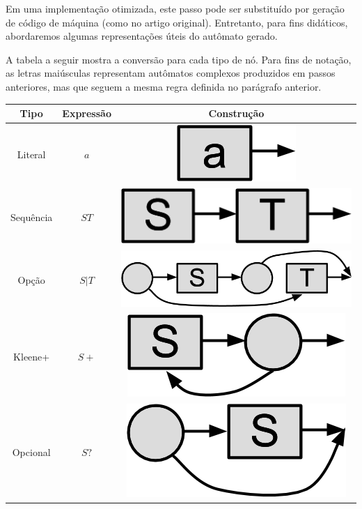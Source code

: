 \documentclass[a4paper,12pt,oneside,onecolumn]{uerj}
\begin{document}
Em uma implementação otimizada, este passo pode ser substituído por geração de código de máquina (como no artigo original). Entretanto, para fins didáticos, abordaremos algumas representações úteis do autômato gerado.

A tabela a seguir mostra a conversão para cada tipo de nó. Para fins de notação, as letras maiúsculas representam autômatos complexos produzidos em passos anteriores, mas que seguem a mesma regra definida no parágrafo anterior.

\begin{center}
	\begin{tabular}{ c | c | c }
		{\bf Tipo} & {\bf Expressão} & {\bf Construção} \\
		\hline
		\hline
		Literal & $a$ & \includegraphics[scale=0.25]{figures/thompson_literal.png} \\ 
		\hline
		Sequência & $ST$ & \includegraphics[scale=0.25]{figures/thompson_sequence.png} \\ 
		\hline
		Opção & $S|T$ & \includegraphics[scale=0.25]{figures/thompson_option.png} \\ 
		\hline
		Kleene+ & $S+$ & \includegraphics[scale=0.25]{figures/thompson_plus.png} \\ 
		\hline
		Opcional & $S?$ & \includegraphics[scale=0.25]{figures/thompson_question.png} \\ 

\end{tabular}
\end{center}
\end{document}
